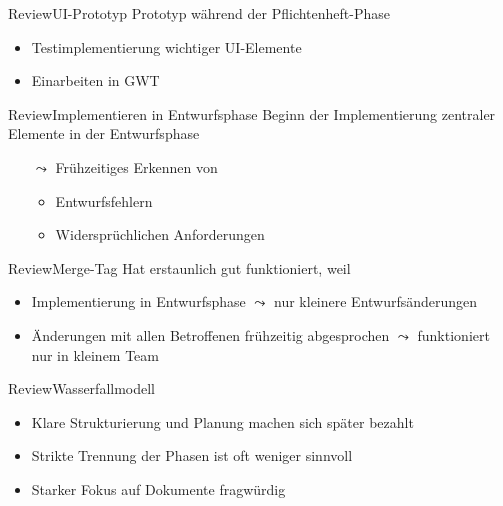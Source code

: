 \documentclass[10pt]{beamer}
\begin{document}
\begin{frame}{Review}{UI-Prototyp}
Prototyp während der Pflichtenheft-Phase
	\begin{itemize}
		\item Testimplementierung wichtiger UI-Elemente
		\item Einarbeiten in GWT
	\end{itemize}
\end{frame}

\begin{frame}{Review}{Implementieren in Entwurfsphase}
Beginn der Implementierung zentraler Elemente in der Entwurfsphase 
	\begin{itemize}
		\item[$\leadsto$] Frühzeitiges Erkennen von 
		\begin{itemize}
			\item Entwurfsfehlern
			\item Widersprüchlichen Anforderungen
		\end{itemize}
	\end{itemize}
\end{frame}

\begin{frame}{Review}{Merge-Tag}
Hat erstaunlich gut funktioniert, weil
	\begin{itemize}
		\item Implementierung in Entwurfsphase $\leadsto$ nur kleinere Entwurfsänderungen %
		\item Änderungen mit allen Betroffenen frühzeitig abgesprochen $\leadsto$ funktioniert nur in kleinem Team
	\end{itemize}
\end{frame}

\begin{frame}{Review}{Wasserfallmodell}
	\begin{itemize}
		\item Klare Strukturierung und Planung machen sich später bezahlt
		\item Strikte Trennung der Phasen ist oft weniger sinnvoll
		\item Starker Fokus auf Dokumente fragwürdig
	\end{itemize}
\end{frame}
\end{document}
